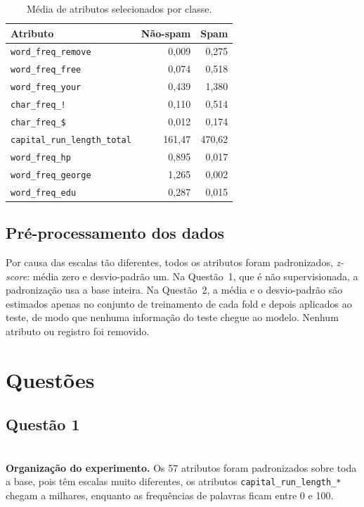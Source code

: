 \documentclass[12pt,reqno]{amsart}
\begin{document}
\begin{table}[H]
\centering
\caption{Média de atributos selecionados por classe.}
\label{tab:medias}
\small
\begin{tabular}{lrr}
\toprule
Atributo & Não-spam & Spam \\
\midrule
\texttt{word\_freq\_remove} & 0,009 & 0,275 \\
\texttt{word\_freq\_free} & 0,074 & 0,518 \\
\texttt{word\_freq\_your} & 0,439 & 1,380 \\
\texttt{char\_freq\_!} & 0,110 & 0,514 \\
\texttt{char\_freq\_\$} & 0,012 & 0,174 \\
\texttt{capital\_run\_length\_total} & 161,47 & 470,62 \\
\midrule
\texttt{word\_freq\_hp} & 0,895 & 0,017 \\
\texttt{word\_freq\_george} & 1,265 & 0,002 \\
\texttt{word\_freq\_edu} & 0,287 & 0,015 \\
\bottomrule
\end{tabular}
\end{table}

\subsection{Pré-processamento dos dados}

Por causa das escalas tão diferentes, todos os atributos foram padronizados, \emph{z-score}:
média zero e desvio-padrão um. Na Questão~1, que é não supervisionada, a padronização usa a
base inteira. Na Questão~2, a média e o desvio-padrão são estimados apenas no conjunto de
treinamento de cada fold e depois aplicados ao teste, de modo que nenhuma informação do teste
chegue ao modelo.
Nenhum atributo ou registro foi removido.


\section{Questões}


\subsection{Questão 1}\mbox{}\\
\textbf{Organização do experimento.}
Os 57 atributos foram padronizados sobre toda a base, pois têm escalas muito
diferentes, os atributos \texttt{capital\_run\_length\_*} chegam a milhares, enquanto as
frequências de palavras ficam entre 0 e 100. 
\end{document}
